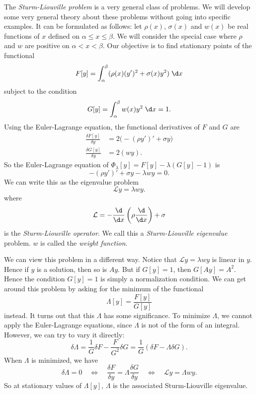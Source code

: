 \documentclass[a4paper]{article}
\begin{document}
\begin{eg}
  The \emph{Sturm-Liouville problem} is a very general class of problems. We will develop some very general theory about these problems without going into specific examples. It can be formulated as follows: let $\rho(x)$, $\sigma(x)$ and $w(x)$ be real functions of $x$ defined on $\alpha \leq x \leq \beta$. We will consider the special case where $\rho$ and $w$ are positive on $\alpha < x < \beta$. Our objective is to find stationary points of the functional
  \[
    F[y] = \int_\alpha^\beta (\rho(x)(y')^2 + \sigma(x)y^2)\;\d x
  \]
  subject to the condition
  \[
    G[y] = \int_\alpha^\beta w(x)y^2\;\d x = 1.
  \]
  Using the Euler-Lagrange equation, the functional derivatives of $F$ and $G$ are
  \begin{align*}
    \frac{\delta F[y]}{\delta y} &= 2\big(-(\rho y')' + \sigma y\big)\\
    \frac{\delta G[y]}{\delta y} &= 2 (wy).
  \end{align*}
  So the Euler-Lagrange equation of $\Phi_\lambda [y] = F[y] - \lambda(G[y] - 1)$ is
  \[
    -(\rho y')' + \sigma y - \lambda wy = 0.
  \]
  We can write this as the eigenvalue problem
  \[
    \mathcal{L}y = \lambda wy.
  \]
  where
  \[
    \mathcal{L} = -\frac{\d}{\d x}\left(\rho\frac{\d}{\d x}\right) + \sigma
  \]
  is the \emph{Sturm-Liouville operator}. We call this a \emph{Sturm-Liouville eigenvalue} problem. $w$ is called the \emph{weight function}.

  We can view this problem in a different way. Notice that $\mathcal{L} y = \lambda wy$ is linear in $y$. Hence if $y$ is a solution, then so is $Ay$. But if $G[y] = 1$, then $G[Ay] = A^2$. Hence the condition $G[y] = 1$ is simply a normalization condition. We can get around this problem by asking for the minimum of the functional
  \[
    \Lambda [y] = \frac{F[y]}{G[y]}
  \]
  instead. It turns out that this $\Lambda$ has some significance. To minimize $\Lambda$, we cannot apply the Euler-Lagrange equations, since $\Lambda$ is not of the form of an integral. However, we can try to vary it directly:
  \[
    \delta\Lambda = \frac{1}{G}\delta F - \frac{F}{G^2} \delta G = \frac{1}{G}(\delta F - \Lambda \delta G).
  \]
  When $\Lambda$ is minimized, we have
  \[
    \delta \Lambda = 0 \quad\Leftrightarrow\quad \frac{\delta F}{\delta y} = \Lambda \frac{\delta G}{\delta y}\quad \Leftrightarrow\quad \mathcal{L} y = \Lambda wy.
  \]
  So at stationary values of $\Lambda[y]$, $\Lambda$ is the associated Sturm-Liouville eigenvalue.
\end{eg}
\end{document}
